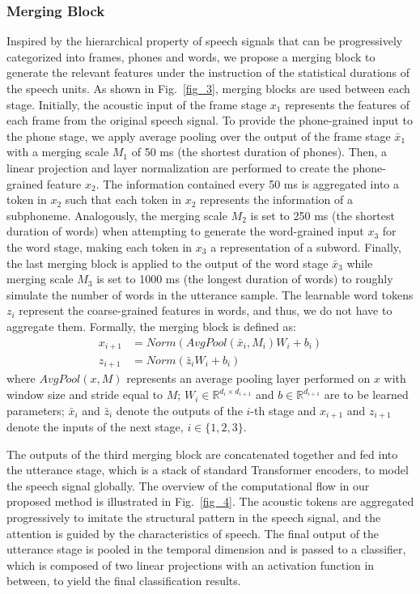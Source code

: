 \documentclass[lettersize,journal]{IEEEtran}
\begin{document}
\subsubsection{Merging Block}
Inspired by the hierarchical property of speech signals that can be progressively categorized into frames, phones and words, we propose a merging block to generate the relevant features under the instruction of the statistical durations of the speech units. As shown in Fig.~\ref{fig_3},  merging blocks are used between each stage. Initially, the acoustic input of the frame stage $x_1$ represents the features of each frame from the original speech signal. To provide the phone-grained input to the phone stage, we apply average pooling over the output of the frame stage $\bar{x}_1$ with a merging scale $M_1$ of 50 ms (the shortest duration of phones). Then, a linear projection and layer normalization are performed to create the phone-grained feature $x_2$. The information contained every 50 ms is aggregated into a token in $x_2$ such that each token in $x_2$ represents the information of a subphoneme. Analogously, the merging scale $M_2$ is set to 250 ms (the shortest duration of words) when attempting to generate the word-grained input $x_3$ for the word stage, making each token in $x_3$ a representation of a subword. Finally, the last merging block is applied to the output of the word stage $\bar{x}_3$ while merging scale $M_3$ is set to 1000 ms (the longest duration of words) to roughly simulate the number of words in the utterance sample. 
The learnable word tokens $z_i$ represent the coarse-grained features in words, and thus, we do not have to aggregate them.
Formally, the merging block is defined as:
\begin{align}
    x_{i+1} &=Norm(AvgPool(\bar{x}_i, M_i)W_i + b_i) \\
    z_{i+1} &= Norm(\bar{z}_iW_i + b_i)
    \label{eq16}
\end{align}
where $AvgPool(x, M)$ represents an average pooling layer performed on $x$ with window size and stride equal to $M$; $W_i \in \mathbb{R}^{d_i \times d_{i+1}}$ and $b \in \mathbb{R}^{d_{i+1}}$ are to be learned parameters; $\bar{x}_i$ and $\bar{z}_i$ denote the outputs of the $i$-th stage and $x_{i+1}$ and $z_{i+1}$ denote the inputs of the next stage, $i \in \{1, 2, 3\}$.

The outputs of the third merging block are concatenated together and fed into the utterance stage, which is a stack of standard Transformer encoders, to model the speech signal globally. 
The overview of the computational flow in our proposed method is illustrated in Fig.~\ref{fig_4}. The acoustic tokens are aggregated progressively to imitate the structural pattern in the speech signal, and the attention is guided by the characteristics of speech. The final output of the utterance stage is pooled in the temporal dimension and is passed to a classifier, which is composed of two linear projections with an activation function in between, to yield the final classification results.
\end{document}
